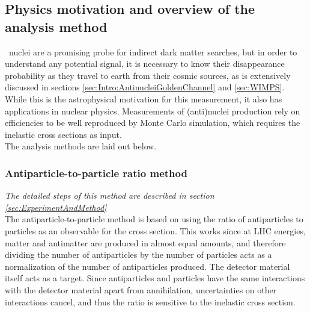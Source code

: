 \subsection{Physics motivation and overview of the analysis method}
\ahe\ nuclei are a promising probe for indirect dark matter searches, but in order to understand any potential signal, it is necessary to know their disappearance probability as they travel to earth from their cosmic sources, as is extensively discussed in sections \ref{sec:Intro:AntinucleiGoldenChannel} and \ref{sec:WIMPS}. While this is the astrophysical motivation for this measurement, it also has applications in nuclear physics. Measurements of (anti)nuclei production rely on efficiencies to be well reproduced by Monte Carlo simulation, which requires the inelastic cross sections as input. \\ 
The analysis methods are laid out below. 
\subsubsection{Antiparticle-to-particle ratio method}
\textit{The detailed steps of this method are described in section \ref{sec:ExperimentAndMethod}}\\
The antiparticle-to-particle method is based on using the ratio of antiparticles to particles as an observable for the cross section. This works since at LHC energies, matter and antimatter are produced in almost equal amounts, and therefore dividing the number of antiparticles by the number of particles acts as a normalization of the number of antiparticles produced. The detector material itself acts as a target. Since antiparticles and particles have the same interactions with the detector material apart from annihilation, uncertainties on other interactions cancel, and thus the ratio is sensitive to the inelastic cross section. 
